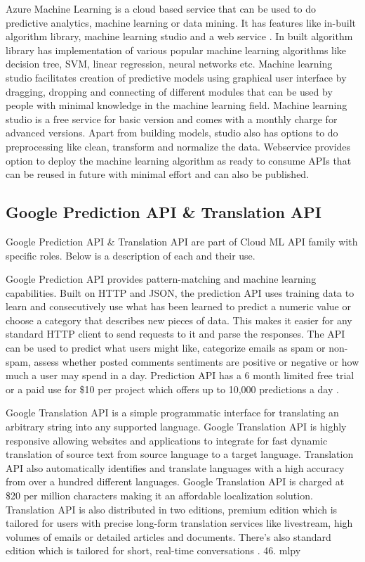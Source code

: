    Azure Machine Learning is a cloud based service that can be used
    to do predictive analytics, machine learning or data mining. It
    has features like in-built algorithm library, machine learning
    studio and a web service \cite{www-azureMLSite}. In built
    algorithm library has implementation of various popular machine
    learning algorithms like decision tree, SVM, linear regression,
    neural networks etc. Machine learning studio facilitates creation
    of predictive models using graphical user interface by dragging,
    dropping and connecting of different modules that can be used by
    people with minimal knowledge in the machine learning
    field. Machine learning studio is a free service for basic version
    and comes with a monthly charge for advanced versions. Apart from
    building models, studio also has options to do preprocessing like
    clean, transform and normalize the data. Webservice provides
    option to deploy the machine learning algorithm as ready to
    consume APIs that can be reused in future with minimal effort and
    can also be published.
    
\subsection{Google Prediction API \& Translation API}

    Google Prediction API \& Translation API are part of Cloud ML API
    family with specific roles. Below is a description of each and
    their use.

    Google Prediction API provides pattern-matching and machine
    learning capabilities. Built on HTTP and JSON, the prediction API
    uses training data to learn and consecutively use what has been
    learned to predict a numeric value or choose a category that
    describes new pieces of data. This makes it easier for any
    standard HTTP client to send requests to it and parse the
    responses. The API can be used to predict what users might like,
    categorize emails as spam or non-spam, assess whether posted
    comments sentiments are positive or negative or how much a user
    may spend in a day. Prediction API has a 6 month limited free
    trial or a paid use for \$10 per project which offers up to 10,000
    predictions a day \cite{www-prediction}.

    Google Translation API is a simple programmatic interface for
    translating an arbitrary string into any supported
    language. Google Translation API is highly responsive allowing
    websites and applications to integrate for fast dynamic
    translation of source text from source language to a target
    language. Translation API also automatically identifies and
    translate languages with a high accuracy from over a hundred
    different languages.  Google Translation API is charged at \$20 per
    million characters making it an affordable localization
    solution. Translation API is also distributed in two editions,
    premium edition which is tailored for users with precise long-form
    translation services like livestream, high volumes of emails or
    detailed articles and documents. There’s also standard edition
    which is tailored for short, real-time
    conversations \cite{www-translation}.
46. mlpy
    
